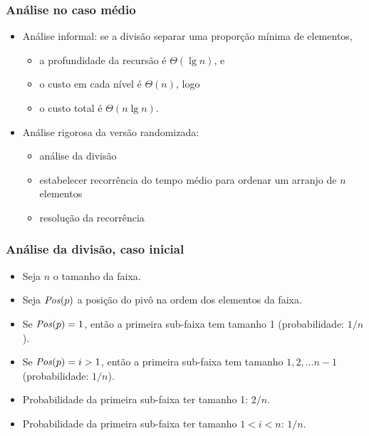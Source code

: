 \documentclass{beamer}
\begin{document}
\begin{frame}

  \frametitle{Análise no caso médio}

  \begin{itemize}

    \item Análise informal: se a divisão separar uma proporção mínima de
      elementos,
      \begin{itemize}
        \item a profundidade da recursão é $\Theta(\lg n)$, e
        \item o custo em cada nível é $\Theta(n)$, logo
        \item o custo total é $\Theta(n \lg n)$.
      \end{itemize}

    \item Análise rigorosa da versão randomizada:

      \begin{itemize}

        \item análise da divisão

        \item estabelecer recorrência do tempo médio para ordenar um
          arranjo de $n$ elementos

        \item resolução da recorrência

      \end{itemize}

  \end{itemize}

\end{frame}

\begin{frame}

  \frametitle{Análise da divisão, caso inicial}

  \begin{itemize}

    \item Seja $n$ o tamanho da faixa.

    \item Seja $\id{Pos}(p)$ a posição do pivô na ordem dos elementos da faixa.

    \item Se $\id{Pos}(p) = 1$, então a primeira sub-faixa tem tamanho 1 (\alert{probabilidade: $1/n$}).

    \item Se $\id{Pos}(p) = i > 1$, então a primeira sub-faixa tem tamanho
      $1, 2, \ldots n-1$ (\alert{probabilidade: $1/n$}).

    \item Probabilidade da primeira sub-faixa ter tamanho 1: $2/n$.

    \item Probabilidade da primeira sub-faixa ter tamanho $1 < i < n$: $1/n$.

  \end{itemize}

\end{frame}
\end{document}
